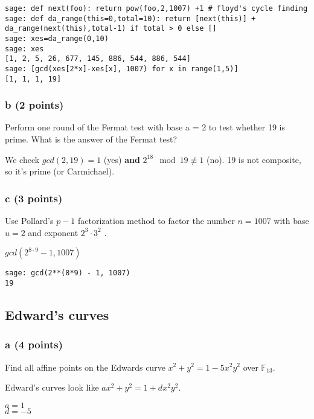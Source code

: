 \documentclass{article}
\begin{document}
\small{
\begin{verbatim}
sage: def next(foo): return pow(foo,2,1007) +1 # floyd's cycle finding
sage: def da_range(this=0,total=10): return [next(this)] + da_range(next(this),total-1) if total > 0 else []
sage: xes=da_range(0,10)
sage: xes
[1, 2, 5, 26, 677, 145, 886, 544, 886, 544]
sage: [gcd(xes[2*x]-xes[x], 1007) for x in range(1,5)]
[1, 1, 1, 19]
\end{verbatim}
}

\subsubsection{b (2 points)}
Perform one round of the Fermat test with base
a = 2 to test whether 19 is prime.
What is the answer of the Fermat test?

We check $gcd(2,19) = 1$ (yes) \textbf{and} $2^{18} \mod 19 \not \equiv 1$ (no).
19 is not composite, so it's prime (or Carmichael).

\subsubsection{c (3 points)}
Use Pollard’s $p - 1$ factorization method to factor the number
$n = 1007$ with base $u = 2$ and exponent $2^3 \cdot 3^2$ .

$gcd(2^{8 \cdot 9} -1, 1007)$ \\
\begin{verbatim}
sage: gcd(2**(8*9) - 1, 1007)
19
\end{verbatim}

\subsection{Edward's curves}
\subsubsection{a (4 points)}
Find all affine points on the Edwards curve
$x^2 + y^2 = 1 - 5x^2y^2$ over $\mathbb{F}_{13}$.

Edward's curves look like $ax^2+y^2 = 1 + dx^2y^2$.

$a=1$ \\
$d=-5$ \\
\end{document}
